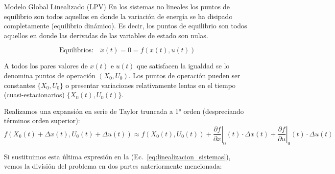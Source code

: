 \documentclass[12pt]{beamer}
\begin{document}
\begin{frame}{Modelo Global Linealizado (LPV)} \scriptsize
En los sistemas no lineales los puntos de equilibrio son todos aquellos en donde la variación de energía se ha disipado completamente (equilibrio dinámico). Es decir, los puntos de equilibrio son todos aquellos en donde las derivadas de las variables de estado son nulas.

\begin{equation*}
\text{Equilibrios:} \quad \dot{x}(t) = 0 = f(x(t),u(t))
\end{equation*}

A todos los pares valores de $x(t)$ e $u(t)$ que satisfacen la igualdad se lo denomina puntos de operación $(X_0,U_0)$. Los puntos de operación pueden ser constantes $\{X_0,U_0\}$ o presentar variaciones relativamente lentas en el tiempo (cuasi-estacionarios) $\{X_0(t),U_0(t)\}$.

Realizamos una expansión en serie de Taylor truncada a 1° orden (despreciando términos orden superior):
\begin{equation}
f(X_0(t) + \Delta x(t), U_0(t) + \Delta u(t)) \approx f(X_0(t),U_0(t)) + \left.\frac{\partial f}{\partial x}\right|_0 (t) \cdot \Delta x(t) + \left.\frac{\partial f}{\partial u}\right|_0 (t) \cdot \Delta u(t)
\end{equation}

Si sustituimos esta última expresión en la (Ec.~\ref{eq:linealizacion_sistemas}), vemos la división del problema en dos partes anteriormente mencionada:
\end{frame}
\end{document}
